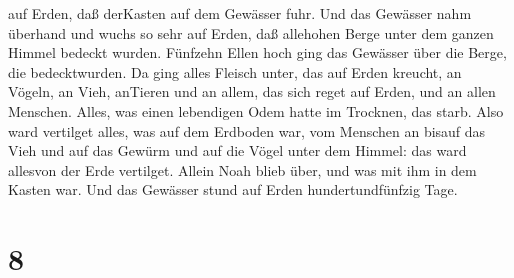 auf Erden, daß derKasten auf dem Gewässer fuhr.  Und das
Gewässer nahm überhand und wuchs so sehr auf Erden, daß allehohen Berge
unter dem ganzen Himmel bedeckt wurden.  Fünfzehn Ellen
hoch ging das Gewässer über die Berge, die bedecktwurden. 
Da ging alles Fleisch unter, das auf Erden kreucht, an Vögeln, an Vieh,
anTieren und an allem, das sich reget auf Erden, und an allen Menschen.
 Alles, was einen lebendigen Odem hatte im Trocknen, das
starb.  Also ward vertilget alles, was auf dem Erdboden
war, vom Menschen an bisauf das Vieh und auf das Gewürm und auf die
Vögel unter dem Himmel: das ward allesvon der Erde vertilget. Allein
Noah blieb über, und was mit ihm in dem Kasten war.  Und
das Gewässer stund auf Erden hundertundfünfzig Tage.

\hypertarget{section-7}{%
\section{8}\label{section-7}}

